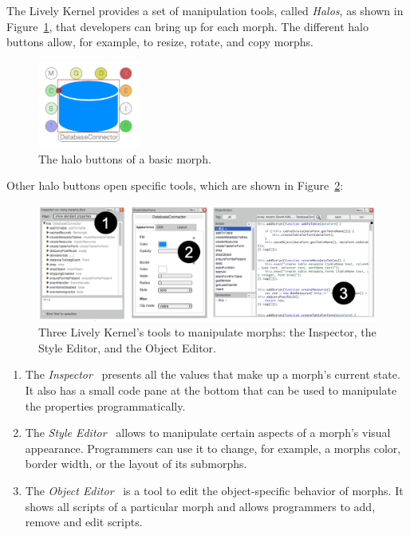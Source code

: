 The Lively Kernel provides a set of manipulation tools, called \emph{Halos}, as shown in Figure~\ref{fig:Halos}, that developers can bring up for each morph.
The different halo buttons allow, for example, to resize, rotate, and copy morphs.

\begin{figure}[h]
    \centering
    \includegraphics[width=0.3\textwidth]{figures/2_background/1_halos.pdf}
    \caption{The halo buttons of a basic morph.}
    \label{fig:Halos}
\end{figure}

Other halo buttons open specific tools, which are shown in Figure~\ref{fig:LivelyTools}:

\begin{figure}[h]
    \centering
    \includegraphics[width=\textwidth]{figures/2_background/2_LivelyTools.pdf}
    \caption{Three Lively Kernel's tools to manipulate morphs: the Inspector, the Style Editor, and the Object Editor.}
    \label{fig:LivelyTools}
\end{figure}

\begin{enumerate}
    \item The \emph{Inspector}~ presents all the values that make up a morph's current state. It also has a small code pane at the bottom that can be used to manipulate the properties programmatically.
    \item The \emph{Style Editor}~ allows to manipulate certain aspects of a morph's visual appearance. Programmers can use it to change, for example, a morphs color, border width, or the layout of its submorphs.
    \item The \emph{Object Editor}~ is a tool to edit the object-specific behavior of morphs. It shows all scripts of a particular morph and allows programmers to add, remove and edit scripts.
\end{enumerate}


